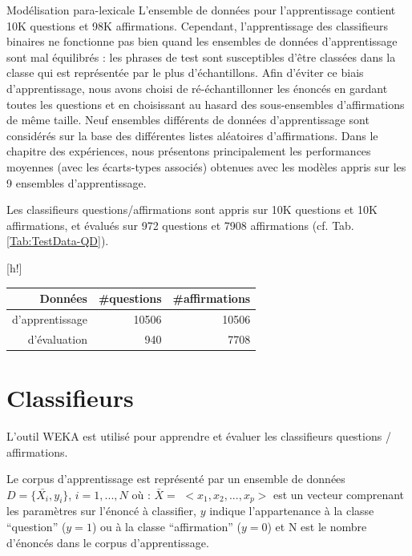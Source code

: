 \documentclass{style/these}
\makeatletter
\renewcommand\familydefault{ptm}
\renewenvironment{table}%
{ \renewcommand{\familydefault}{ptm}\selectfont
  \@float{table}}
  {\end@float}
\let\oldcite=\cite
\renewcommand{\cite}[1]{{\fontfamily{qcs}\selectfont{\color{darkerblue}[\oldcite{#1}]}}}
\makeatother
\begin{document}
\begin{part}{Modélisation para-lexicale}
L'ensemble de données pour l'apprentissage contient 10K questions et 98K affirmations. 
Cependant, l'apprentissage des classifieurs binaires ne fonctionne pas bien quand les ensembles de données d'apprentissage sont mal équilibrés : les phrases de test sont susceptibles d'être classées dans la classe qui est représentée par le plus d'échantillons. 
Afin d'éviter ce biais d'apprentissage, nous avons choisi de ré-échantillonner les énoncés en gardant toutes les questions et en choisissant au hasard des sous-ensembles d'affirmations de même taille. Neuf ensembles différents de données d'apprentissage sont considérés sur la base des différentes listes aléatoires d'affirmations. 
Dans le chapitre des expériences, nous présentons principalement les performances moyennes (avec les écarts-types associés) obtenues avec les modèles appris sur les 9 ensembles d'apprentissage.

Les classifieurs questions/affirmations sont appris sur 10K questions et 10K affirmations, et évalués sur 972 questions et 7908 affirmations (cf. Tab. \ref{Tab:TestData-QD}).


\begin{table}[h!]
\centering
\begin{tabular}{|r|r|r|}
\hline
\textbf{Données} 	& \textbf{\#questions} & \textbf{\#affirmations} \\ \hline
d'apprentissage 	& 10506	& 10506		\\ \hline
d'évaluation	 	& 940	&  7708		\\ \hline
\end{tabular}
\caption{Description des données utilisées dans nos expériences}
\label{Tab:TestData-QD}
\end{table}

\section{Classifieurs}
\label{Sec:Class}
\renewcommand{\rightmark}{Classifieurs}

L'outil WEKA \cite{Hall:2009} est utilisé pour apprendre et évaluer les classifieurs questions / affirmations.

Le corpus d'apprentissage est représenté par un ensemble de données  $D=\{\bar{X_i}, y_i\}$, $i=1,...,N$ où : $\bar{X}=$ $<x_1, x_2, ..., x_p>$ est un vecteur comprenant les paramètres sur l'énoncé à classifier, $y$ indique l'appartenance à la classe ``question'' ($y=1$) ou à la classe ``affirmation'' ($y=0$) et N est le nombre d'énoncés dans le corpus d'apprentissage. 


\end{part}
\end{document}
